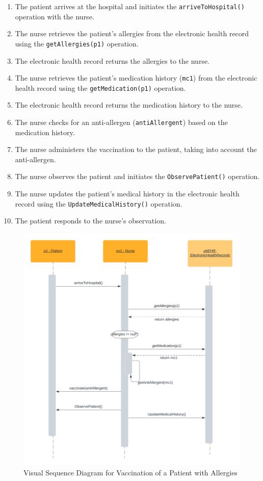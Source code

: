 \begin{enumerate}
\item The patient arrives at the hospital and initiates the \texttt{arriveToHospital()} operation with the nurse.
\item The nurse retrieves the patient's allergies from the electronic health record using the \texttt{getAllergies(p1)} operation.
\item The electronic health record returns the allergies to the nurse.
\item The nurse retrieves the patient's medication history (\texttt{mc1}) from the electronic health record using the \texttt{getMedication(p1)} operation.
\item The electronic health record returns the medication history to the nurse.
\item The nurse checks for an anti-allergen (\texttt{antiAllergent}) based on the medication history.
\item The nurse administers the vaccination to the patient, taking into account the anti-allergen.
\item The nurse observes the patient and initiates the \texttt{ObservePatient()} operation.
\item The nurse updates the patient's medical history in the electronic health record using the \texttt{UpdateMedicalHistory()} operation.
\item The patient responds to the nurse's observation.
\end{enumerate}

\begin{figure}[htb]
\begin{center}\includegraphics[width=12cm]{src/pic/Vaccination_With_allergies.png}\end{center}
\caption{Visual Sequence Diagram for Vaccination of a Patient with Allergies}
\label{VACA2}
\end{figure}


